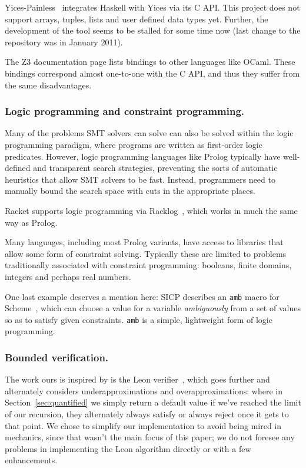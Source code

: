Yices-Painless~\cite{yices-painless} integrates Haskell with Yices via its C
API. This project does not support arrays, tuples, lists and user defined data
types yet. Further, the development of the tool seems to be stalled for some
time now (last change to the repository was in January 2011).

The Z3 documentation page lists bindings to other languages like OCaml. These
bindings correspond almost one-to-one with the C API, and thus they suffer
from the same disadvantages.

\subsubsection{Logic programming and constraint programming.}

Many of the problems SMT solvers can solve can also be solved within the logic
programming paradigm, where programs are written as first-order logic
predicates. However, logic programming languages like Prolog typically have
well-defined and transparent search strategies, preventing the sorts of
automatic heuristics that allow SMT solvers to be fast. Instead, programmers
need to manually bound the search space with cuts in the appropriate places.

Racket supports logic programming via Racklog~\cite{racklog}, which works in
much the same way as Prolog.

Many languages, including most Prolog variants, have access to libraries that
allow some form of constraint solving. Typically these are limited to problems
traditionally associated with constraint programming: booleans, finite
domains, integers and perhaps real numbers.

One last example deserves a mention here: SICP describes an \texttt{amb} macro
for Scheme~\cite[Section~4.3]{sicp}, which can choose a value for a variable
\textit{ambiguously} from a set of values so as to satisfy given constraints.
\texttt{amb} is a simple, lightweight form of logic programming.

\subsubsection{Bounded verification.}

The work ours is inspired by is the Leon verifier~\cite{sat-recursive}, which
goes further and alternately considers underapproximations and
overapproximations: where in Section~\ref{sec:quantified} we simply return a
default value if we've reached the limit of our recursion, they alternately
always satisfy or always reject once it gets to that point. We chose to
simplify our implementation to avoid being mired in mechanics, since that
wasn't the main focus of this paper; we do not foresee any problems in
implementing the Leon algorithm directly or with a few enhancements.
